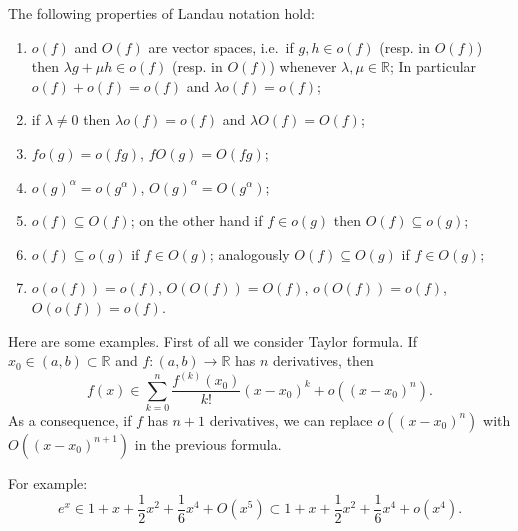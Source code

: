 \documentclass[12pt]{article}
\newcommand{\R}{\mathbb R}
\theoremstyle{remark}
\begin{document}
The following properties of Landau notation hold:
\begin{enumerate}
\item $o(f)$ and $O(f)$ are vector spaces, i.e.\ if $g,h\in o(f)$ (resp. in $O(f)$) then $\lambda g + \mu h \in o(f)$ (resp. in $O(f)$) whenever $\lambda,\mu \in \R$;
In particular $o(f) + o(f) = o(f)$ and $\lambda o(f) = o(f)$;
\item if $\lambda\neq 0$ then $\lambda o(f) = o(f)$ and $\lambda O(f)=O(f)$;
\item $f o(g)=o(f g)$, $f O(g)= O(f g)$;
\item $o(g)^\alpha = o(g^\alpha)$, $O(g)^\alpha = O(g^\alpha)$;
\item $o(f) \subseteq O(f)$; on the other hand if $f\in o(g)$ then $O(f)\subseteq o(g)$;
\item $o(f)\subseteq o(g)$ if $f\in O(g)$; analogously $O(f)\subseteq O(g)$ if $f\in O(g)$;
\item $o(o(f))=o(f)$, $O(O(f))=O(f)$, $o(O(f))=o(f)$, $O(o(f))=o(f)$.
\end{enumerate}

Here are some examples.
First of all we consider Taylor formula. 
If $x_0\in (a,b)\subset \R$ and $f\colon (a,b)\to \R$ has $n$ derivatives, then
\[
  f(x) \in \sum_{k=0}^n \frac{f^{(k)}(x_0)}{k!} (x-x_0)^k + o((x-x_0)^n).
\]
As a consequence, if $f$ has $n+1$ derivatives, we can replace $o((x-x_0)^n)$ with $O((x-x_0)^{n+1})$ in the previous formula.

For example:
\[
  e^x \in 1 + x + \frac 12 x^2 + \frac 16 x^4 + O(x^5)
   \subset 1 + x + \frac 12 x^2 + \frac 16 x^4 + o(x^4).
\]
\end{document}
